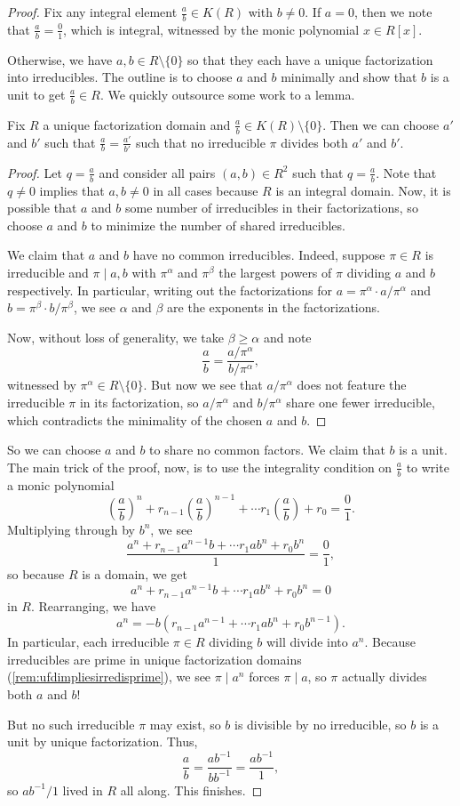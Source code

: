 \begin{proof}
	Fix any integral element $\frac ab\in K(R)$ with $b\ne0$. If $a=0$, then we note that $\frac ab=\frac01$, which is integral, witnessed by the monic polynomial $x\in R[x]$.
	
	Otherwise, we have $a,b\in R\setminus\{0\}$ so that they each have a unique factorization into irreducibles. The outline is to choose $a$ and $b$ minimally and show that $b$ is a unit to get $\frac ab\in R$. We quickly outsource some work to a lemma.
	\begin{lemma}
		Fix $R$ a unique factorization domain and $\frac ab\in K(R)\setminus\{0\}$. Then we can choose $a'$ and $b'$ such that $\frac ab=\frac{a'}{b'}$ such that no irreducible $\pi$ divides both $a'$ and $b'$.
	\end{lemma}
	\begin{proof}
		Let $q=\frac ab$ and consider all pairs $(a,b)\in R^2$ such that $q=\frac ab$. Note that $q\ne0$ implies that $a,b\ne0$ in all cases because $R$ is an integral domain. Now, it is possible that $a$ and $b$ some number of irreducibles in their factorizations, so choose $a$ and $b$ to minimize the number of shared irreducibles.
		
		We claim that $a$ and $b$ have no common irreducibles. Indeed, suppose $\pi\in R$ is irreducible and $\pi\mid a,b$ with $\pi^\alpha$ and $\pi^\beta$ the largest powers of $\pi$ dividing $a$ and $b$ respectively. In particular, writing out the factorizations for $a=\pi^\alpha\cdot a/\pi^\alpha$ and $b=\pi^\beta\cdot b/\pi^\beta$, we see $\alpha$ and $\beta$ are the exponents in the factorizations.
		
		Now, without loss of generality, we take $\beta\ge\alpha$ and note
		\[\frac ab=\frac{a/\pi^\alpha}{b/\pi^\alpha},\]
		witnessed by $\pi^\alpha\in R\setminus\{0\}$. But now we see that $a/\pi^\alpha$ does not feature the irreducible $\pi$ in its factorization, so $a/\pi^\alpha$ and $b/\pi^\alpha$ share one fewer irreducible, which contradicts the minimality of the chosen $a$ and $b$.
	\end{proof}
	So we can choose $a$ and $b$ to share no common factors. We claim that $b$ is a unit. The main trick of the proof, now, is to use the integrality condition on $\frac ab$ to write a monic polynomial
	\[\left(\frac ab\right)^n+r_{n-1}\left(\frac ab\right)^{n-1}+\cdots r_1\left(\frac ab\right)+r_0=\frac01.\]
	Multiplying through by $b^n$, we see
	\[\frac{a^n+r_{n-1}a^{n-1}b+\cdots r_1ab^n+r_0b^n}1=\frac01,\]
	so because $R$ is a domain, we get
	\[a^n+r_{n-1}a^{n-1}b+\cdots r_1ab^n+r_0b^n=0\]
	in $R$. Rearranging, we have
	\[a^n=-b\left(r_{n-1}a^{n-1}+\cdots r_1ab^n+r_0b^{n-1}\right).\]
	In particular, each irreducible $\pi\in R$ dividing $b$ will divide into $a^n$. Because irreducibles are prime in unique factorization domains (\autoref{rem:ufdimpliesirredisprime}), we see $\pi\mid a^n$ forces $\pi\mid a$, so $\pi$ actually divides both $a$ and $b$!

	But no such irreducible $\pi$ may exist, so $b$ is divisible by no irreducible, so $b$ is a unit by unique factorization. Thus,
	\[\frac ab=\frac{ab^{-1}}{bb^{-1}}=\frac{ab^{-1}}1,\]
	so $ab^{-1}/1$ lived in $R$ all along. This finishes.
\end{proof}
